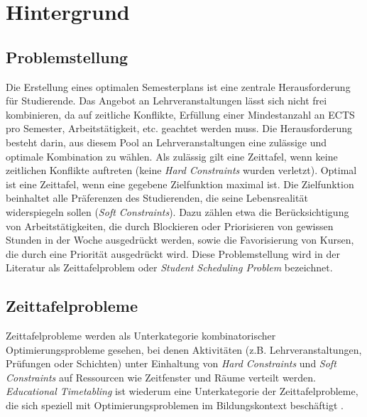 \section{Hintergrund}\label{chap:hintergrund}






\subsection{Problemstellung}


Die Erstellung eines optimalen Semesterplans ist eine zentrale Herausforderung für Studierende. Das Angebot an Lehrveranstaltungen lässt sich nicht frei kombinieren, da auf zeitliche Konflikte, Erfüllung einer Mindestanzahl an ECTS pro Semester, Arbeitstätigkeit, etc. geachtet werden muss.
Die Herausforderung besteht darin, aus diesem Pool an Lehrveranstaltungen eine zulässige und optimale Kombination zu wählen. Als zulässig gilt eine Zeittafel, wenn keine zeitlichen Konflikte auftreten (keine \textit{Hard Constraints} wurden verletzt). Optimal ist eine Zeittafel, wenn eine gegebene Zielfunktion maximal ist. Die Zielfunktion beinhaltet alle Präferenzen des Studierenden, die seine Lebensrealität widerspiegeln sollen (\textit{Soft Constraints}). Dazu zählen etwa die Berücksichtigung von Arbeitstätigkeiten, die durch Blockieren oder Priorisieren von gewissen Stunden in der Woche ausgedrückt werden, sowie die Favorisierung von Kursen, die durch eine Priorität ausgedrückt wird.
Diese Problemstellung wird in der Literatur als Zeittafelproblem oder \textit{Student Scheduling Problem} bezeichnet.





\subsection{Zeittafelprobleme}


Zeittafelprobleme werden als Unterkategorie kombinatorischer Optimierungsprobleme gesehen, bei denen Aktivitäten (z.B. Lehrveranstaltungen, Prüfungen oder Schichten) unter Einhaltung von \textit{Hard Constraints} und \textit{Soft Constraints} auf Ressourcen wie Zeitfenster und Räume verteilt werden. \textit{Educational Timetabling} ist wiederum eine Unterkategorie der Zeittafelprobleme, die sich speziell mit Optimierungsproblemen im Bildungskontext beschäftigt \cite{ceschia-2022}.

